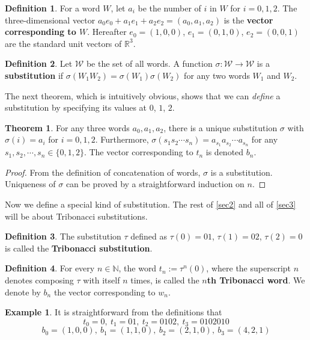 \documentclass{article}
\theoremstyle{definition}
\newtheorem{theorem}{Theorem}
\newtheorem*{definition}{Definition}
\newtheorem*{example}{Example}
\begin{document}
\begin{definition}
For a word $W$, let $a_i$ be the number of $i$ in $W$ for $i=0,1,2$. The three-dimensional vector $a_0e_0+a_1e_1+a_2e_2=(a_0, a_1, a_2)$ is the \textbf{vector corresponding to $W$}. Hereafter $e_0=(1,0,0)$, $e_1=(0,1,0)$, $e_2=(0,0,1)$ are the standard unit vectors of $\mathbb{R}^3$.
\end{definition}
\begin{definition}
Let $\mathcal{W}$ be the set of all words. A function $\sigma: \mathcal{W}\rightarrow \mathcal{W}$ is a \textbf{substitution} if $\sigma(W_1W_2)=\sigma(W_1)\sigma(W_2)$ for any two words $W_1$ and $W_2$.
\end{definition}

The next theorem, which is intuitively obvious, shows that we can \textit{define} a substitution by specifying its values at $0$, $1$, $2$.

\begin{theorem}
For any three words $a_0, a_1, a_2$, there is a unique substitution $\sigma$ with $\sigma(i)=a_i$ for $i=0,1,2$. Furthermore, $\sigma(s_1s_2\cdots s_n)=a_{s_1}a_{s_2}\cdots a_{s_n}$ for any $s_1, s_2, \cdots, s_n\in\{0,1,2\}$. The vector corresponding to $t_n$ is denoted $b_n$.
\end{theorem}
\begin{proof}
From the definition of concatenation of words, $\sigma$ is a substitution. Uniqueness of $\sigma$ can be proved by a straightforward induction on $n$.
\end{proof}

Now we define a special kind of substitution. The rest of \cref{sec2} and all of \cref{sec3} will be about Tribonacci substitutions.

\begin{definition}
The substitution $\tau$ defined as $\tau(0)=01$, $\tau(1)=02$, $\tau(2)=0$ is called the \textbf{Tribonacci substitution}.
\end{definition}

\begin{definition}
For every $n\in \mathbb{N}$, the word $t_n:=\tau^n(0)$, where the superscript $n$ denotes composing $\tau$ with itself $n$ times, is called the \textbf{$n$th Tribonacci word}. We denote by $b_n$ the vector corresponding to $w_n$.
\end{definition}
\begin{example}
It is straightforward from the definitions that
\[ t_0=0,  \ t_1=01,\ t_2=0102, \ t_3=0102010\]
\[ b_0=(1, 0, 0),  \ b_1=(1, 1, 0),\ b_2=(2, 1, 0), \ b_3=(4, 2, 1)\]
\end{example}
\end{document}
